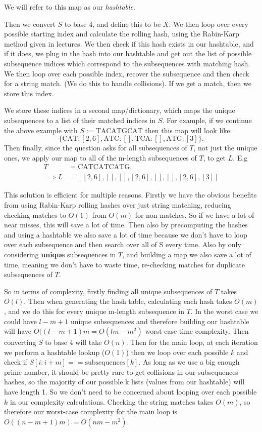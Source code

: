 \documentclass[a4paper, oneside]{book}
\begin{document}
We will refer to this map as our \textit{hashtable}.

Then we convert $S$ to base $4$, and define this to be $X$. We then loop over every
possible starting index and calculate the rolling hash, using the Rabin-Karp method
given in lectures. We then check if this hash exists in our hashtable, and
if it does, we plug in the hash into our hashtable and get out the list of possible
subsequence indices which correspond to the subsequences with matching hash.
We then loop over each possible index, recover the subsequence and then check for a string match.
(We do this to handle collisions). If we get a match, then we store this index.

We store these indices in a second map/dictionary, which maps the unique subsequences to
a list of their matched indices in $S$. For example, if we continue the above example
with  $S := \text{TACATGCAT}$ then this map will look like:
\[
    \{\text{CAT}: [2, 6], \text{ATC}: [], \text{TCA}: [], \text{ATG}: [3]\}
.\]
Then finally, since the question asks for all subsequences of $T$, not just the unique ones,
we apply our map to all of the m-length subsequences of $T$, to get $L$. E.g
\begin{align*}
    T &= \text{CATCATCATG}, \\
    \implies L &= [[2, 6], [], [], [2, 6], [], [], [2, 6], [3]]
\end{align*}

This solution is efficient for multiple reasons. Firstly we have the obvious benefits from
using Rabin-Karp rolling hashes over just string matching, reducing checking matches
to $O(1)$ from $O(m)$ for non-matches. So if we have a lot of near misses, this will
save a lot of time. Then also by precomputing the hashes and using a hashtable we also save a lot of time
because we don't have to loop over each subsequence and then search over all of S every time.
Also by only considering \textbf{unique} subsequences in $T$, and building a map
we also save a lot of time, meaning we don't have to waste time, re-checking matches
for duplicate subsequences of $T$. 

So in terms of complexity, firstly finding all unique subsequences of $T$ takes $O(l)$.
Then when generating the hash table, calculating each hash takes $O(m)$, and we do this
for every unique m-length subsequence in $T$. In the worst case we could have $l - m + 1$
unique subsequences and therefore building our hashtable will have $O((l - m + 1)m = O(lm - m^2)$
worst-case time complexity. Then converting $S$ to base 4 will take $O(n)$.
Then for the main loop, at each iteration we perform a hashtable lookup ($O(1)$)
then we loop over each possible $k$ and check if $S[i:i+m] == \text{subsequences}[k]$.
As long as we use a big enough prime number, it should be pretty rare to get collisions
in our subsequences hashes, so the majority of our possible k lists (values from our hashtable)
will have length 1. So we don't need to be concerned about looping over each possible $k$ in our complexity calculations.
Checking the string matches takes $O(m)$, so therefore our worst-case complexity for
the main loop is $O((n - m + 1)m) = O(nm - m^2)$.
\end{document}

